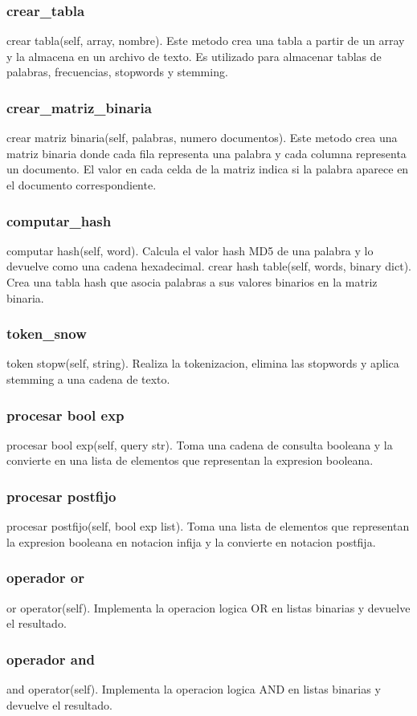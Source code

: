 \subsubsection{crear\_tabla}
crear tabla(self, array, nombre). Este metodo crea una tabla a partir de un array y la almacena en un archivo de texto. Es utilizado para almacenar tablas de palabras, frecuencias, stopwords y stemming.
\subsubsection{crear\_matriz\_binaria}
crear matriz binaria(self, palabras, numero documentos). Este metodo crea una matriz binaria donde cada fila representa una palabra y cada columna representa un documento. El valor en cada celda de la matriz indica si la palabra aparece en el documento correspondiente.
\subsubsection{computar\_hash}
computar hash(self, word). Calcula el valor hash MD5 de una palabra y lo devuelve como una cadena hexadecimal. crear hash table(self, words, binary dict). Crea una tabla hash que asocia palabras a sus valores binarios en la matriz binaria.
\subsubsection{token\_snow}
token stopw(self, string). Realiza la tokenizacion, elimina las stopwords y aplica stemming a una cadena de texto.
\subsubsection{procesar bool exp}
procesar bool exp(self, query str). Toma una cadena de consulta booleana y la convierte en una
lista de elementos que representan la expresion booleana.
\subsubsection{procesar postfijo}
procesar postfijo(self, bool exp list). Toma una lista de elementos que representan la expresion
booleana en notacion infija y la convierte en notacion postfija.
\subsubsection{operador or}
or operator(self). Implementa la operacion logica OR en listas binarias y devuelve el resultado.
\subsubsection{operador and}
and operator(self). Implementa la operacion logica AND en listas binarias y devuelve el resultado.
